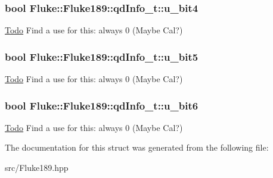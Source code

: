 \hypertarget{structFluke_1_1Fluke189_1_1qdInfo__t_a012174b29b7e6686a724204f63a09c91}{
\subsubsection[{u\_\-bit4}]{\setlength{\rightskip}{0pt plus 5cm}bool {\bf Fluke::Fluke189::qdInfo\_\-t::u\_\-bit4}}}
\label{structFluke_1_1Fluke189_1_1qdInfo__t_a012174b29b7e6686a724204f63a09c91}
\begin{Desc}
\item[\hyperlink{todo__todo000011}{Todo}]Find a use for this: always 0 (Maybe Cal?) \end{Desc}
\hypertarget{structFluke_1_1Fluke189_1_1qdInfo__t_ad123acd44f39185d0903250085834b72}{
\subsubsection[{u\_\-bit5}]{\setlength{\rightskip}{0pt plus 5cm}bool {\bf Fluke::Fluke189::qdInfo\_\-t::u\_\-bit5}}}
\label{structFluke_1_1Fluke189_1_1qdInfo__t_ad123acd44f39185d0903250085834b72}
\begin{Desc}
\item[\hyperlink{todo__todo000012}{Todo}]Find a use for this: always 0 (Maybe Cal?) \end{Desc}
\hypertarget{structFluke_1_1Fluke189_1_1qdInfo__t_a3a48f6b82d6abd8613a7f7f091c7ad16}{
\subsubsection[{u\_\-bit6}]{\setlength{\rightskip}{0pt plus 5cm}bool {\bf Fluke::Fluke189::qdInfo\_\-t::u\_\-bit6}}}
\label{structFluke_1_1Fluke189_1_1qdInfo__t_a3a48f6b82d6abd8613a7f7f091c7ad16}
\begin{Desc}
\item[\hyperlink{todo__todo000013}{Todo}]Find a use for this: always 0 (Maybe Cal?) \end{Desc}


The documentation for this struct was generated from the following file:\begin{DoxyCompactItemize}
\item 
src/Fluke189.hpp\end{DoxyCompactItemize}
